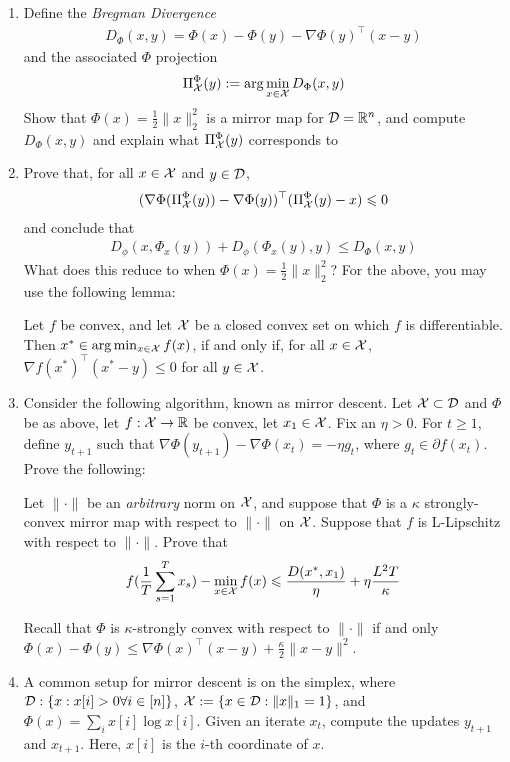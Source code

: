 \documentclass[12pt]{article}
\begin{document}
\begin{enumerate}
\item
Define the \emph{Bregman Divergence}
\begin{eqnarray}
D_{\Phi}(x,y) = \Phi(x) - \Phi(y) - \nabla \Phi(y)^{\top}(x-y)
\end{eqnarray}
and the associated $\Phi$ projection
\begin{eqnarray}
\Pi_{{\cal X}}^{\Phi}(y):= \arg\min_{x \in {\cal X}} D_{\Phi}(x,y)
\end{eqnarray}
Show that $\Phi(x) = \frac{1}{2}\|x\|^2_2$ is a mirror map for ${\cal D} = \mathbb{R}^n$, and compute $D_{\Phi}(x,y)$ and explain what $\Pi_{{\cal X}}^{\Phi}(y)$ corresponds to
\item
Prove that, for all $x \in {\cal X}$ and $y \in {\cal D}$,
\begin{eqnarray}
(\nabla \Phi(\Pi_{{\cal X}}^{\Phi}(y)) - \nabla \Phi(y))^\top(\Pi_{{\cal X}}^{\Phi}(y) - x) \leqslant 0
\end{eqnarray}
and conclude that
\begin{eqnarray}
D_{\phi}(x,\Phi_{x}(y)) + D_{\phi}(\Phi_{x}(y),y) \le D_{\Phi}(x,y) 
\end{eqnarray}
What does this reduce to when $\Phi(x) = \frac{1}{2}\|x\|^2_2$? For the above, you may use the following lemma:
\begin{lemma*} Let $f$ be convex, and let ${\cal X}$ be a closed convex set on which $f$ is differentiable. Then $x^* \in \arg\min_{x \in {\cal X}} f(x)$, if and only if, for all $x \in {\cal X}$, $\nabla f(x^*)^\top ( x^* - y) \le 0$ for all $y \in {\cal X}$.
\end{lemma*}
\item
Consider the following algorithm, known as mirror descent. Let ${\cal X} \subset {\cal D}$ and $\Phi$ be as above, let $f: {\cal X} \to \mathbb{R}$ be convex, let $x_1  \in {\cal X}$. Fix an $\eta > 0$. For $t \ge 1$, define $y_{t+1}$ such that $\nabla \Phi(y_{t+1}) - \nabla \Phi(x_{t}) = -\eta g_t$, where $g_t \in \partial f(x_t)$. Prove the following:
\begin{theorem*} Let $\|\cdot\|$ be an \emph{arbitrary} norm on ${\cal X}$, and suppose that $\Phi$ is a $\kappa$ strongly-convex mirror map with respect to $\|\cdot\|$ on ${\cal X}$. Suppose that $f$ is L-Lipschitz with respect to $\|\cdot\|$. Prove that 
\begin{eqnarray}
f(\frac{1}{T}\sum_{s=1}^T x_s) - \min_{x \in {\cal X}} f(x) \leqslant \frac{D(x^*,x_1)}{\eta} + \eta \frac{L^2 T}{\kappa}
\end{eqnarray}
\end{theorem*}
Recall that $\Phi$ is $\kappa$-strongly convex with respect to $\|\cdot\|$ if and only $\Phi(x)  - \Phi(y) \le \nabla \Phi(x)^\top (x-y) + \frac{\kappa}{2}\|x-y\|^2$. 
\item
A common setup for mirror descent is on the simplex, where ${\cal D}: \{x: x[i] > 0 \forall i \in [n]\}$, ${\cal X} := \{x \in {\cal D}:\|x\|_1 = 1\}$, and $\Phi(x) = \sum_i x[i] \log x[i]$. Given an iterate $x_t$, compute the updates $y_{t+1}$ and $x_{t+1}$. Here, $x[i]$ is the $i$-th coordinate of $x$.
\end{enumerate}
\newpage
\end{document}
